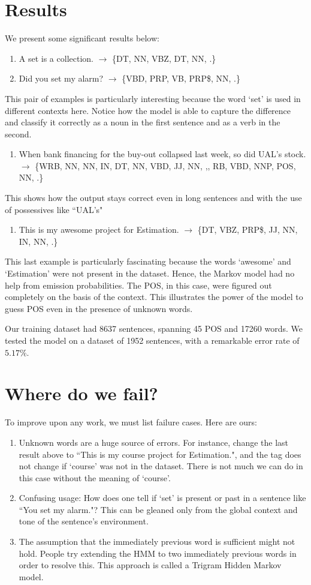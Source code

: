 \documentclass[11pt]{article}
\begin{document}
\section{Results}
We present some significant results below:
\begin{enumerate}
\item A set is a collection. $\rightarrow$ \{DT, NN, VBZ, DT, NN, .\}
\item Did you set my alarm? $\rightarrow$ \{VBD, PRP, VB, PRP\$, NN, .\}
\end{enumerate}
%
This pair of examples is particularly interesting because the word `set' is used in different contexts here. Notice how the model is able to capture the difference and classify it correctly as a noun in the first sentence and as a verb in the second.
%
\begin{enumerate}[resume]
\item When bank financing for the buy-out collapsed last week, so did UAL's stock. $\rightarrow$ \{WRB, NN, NN, IN, DT, NN, VBD, JJ, NN, ,, RB, VBD, NNP, POS, NN, .\}
\end{enumerate}
%
This shows how the output stays correct even in long sentences and with the use of possessives like ``UAL's"
%
\begin{enumerate}[resume]
\item This is my awesome project for Estimation. $\rightarrow$ \{DT, VBZ, PRP\$, JJ, NN, IN, NN, .\}
\end{enumerate}
%
This last example is particularly fascinating because the words `awesome' and `Estimation' were not present in the dataset. Hence, the Markov model had no help from emission probabilities. The POS, in this case, were figured out completely on the basis of the context. This illustrates the power of the model to guess POS even in the presence of unknown words.

Our training dataset had 8637 sentences, spanning 45 POS and 17260 words. We tested the model on a dataset of 1952 sentences, with a remarkable error rate of $5.17\%$.

\section{Where do we fail?}
To improve upon any work, we must list failure cases. Here are ours:
\begin{enumerate}
\item Unknown words are a huge source of errors. For instance, change the last result above to ``This is my course project for Estimation.", and the tag does not change if `course' was not in the dataset. There is not much we can do in this case without the meaning of `course'.
\item Confusing usage: How does one tell if `set' is present or past in a sentence like ``You set my alarm."? This can be gleaned only from the global context and tone of the sentence's environment.
\item The assumption that the immediately previous word is sufficient might not hold. People try extending the HMM to two immediately previous words in order to resolve this. This approach is called a Trigram Hidden Markov model.
\end{enumerate}
\end{document}
